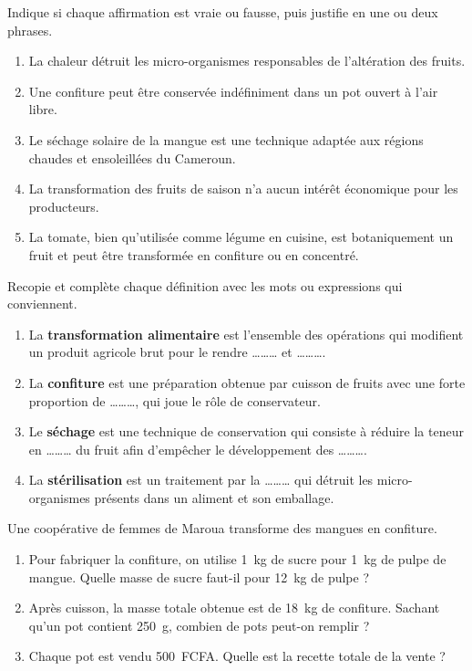 \documentclass[11pt]{article}
\begin{document}
\begin{exercice}
Indique si chaque affirmation est vraie ou fausse, puis justifie en une ou deux phrases.
\begin{enumerate}
\item La chaleur détruit les micro-organismes responsables de l'altération des fruits.
\item Une confiture peut être conservée indéfiniment dans un pot ouvert à l'air libre.
\item Le séchage solaire de la mangue est une technique adaptée aux régions chaudes et ensoleillées du Cameroun.
\item La transformation des fruits de saison n'a aucun intérêt économique pour les producteurs.
\item La tomate, bien qu'utilisée comme légume en cuisine, est botaniquement un fruit et peut être transformée en confiture ou en concentré.
\end{enumerate}
\end{exercice}

\begin{exercice}
Recopie et complète chaque définition avec les mots ou expressions qui conviennent.
\begin{enumerate}
\item La \textbf{transformation alimentaire} est l'ensemble des opérations qui modifient un produit agricole brut pour le rendre \ldots\ldots\ldots{} et \ldots\ldots\ldots{}.
\item La \textbf{confiture} est une préparation obtenue par cuisson de fruits avec une forte proportion de \ldots\ldots\ldots{}, qui joue le rôle de conservateur.
\item Le \textbf{séchage} est une technique de conservation qui consiste à réduire la teneur en \ldots\ldots\ldots{} du fruit afin d'empêcher le développement des \ldots\ldots\ldots{}.
\item La \textbf{stérilisation} est un traitement par la \ldots\ldots\ldots{} qui détruit les micro-organismes présents dans un aliment et son emballage.
\end{enumerate}
\end{exercice}

\begin{exercice}
Une coopérative de femmes de Maroua transforme des mangues en confiture.
\begin{enumerate}
\item Pour fabriquer la confiture, on utilise \SI{1}{kg} de sucre pour \SI{1}{kg} de pulpe de mangue. Quelle masse de sucre faut-il pour \SI{12}{kg} de pulpe ?
\item Après cuisson, la masse totale obtenue est de \SI{18}{kg} de confiture. Sachant qu'un pot contient \SI{250}{g}, combien de pots peut-on remplir ?
\item Chaque pot est vendu 500~FCFA. Quelle est la recette totale de la vente ?
\end{enumerate}
\end{exercice}
\end{document}
